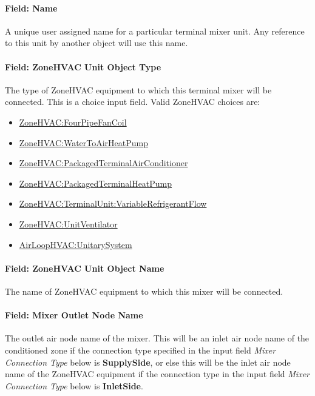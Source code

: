 \paragraph{Field: Name}\label{field-name-12}

A unique user assigned name for a particular terminal mixer unit. Any reference to this unit by another object will use this name.

\paragraph{Field: ZoneHVAC Unit Object Type}\label{field-zonehvac-unit-object-type}

The type of ZoneHVAC equipment to which this terminal mixer will be connected. This is a choice input field.
Valid ZoneHVAC choices are:
\begin{itemize}
\setlength{\parskip}{0pt}
\setlength{\itemsep}{0pt plus 1pt}
\item \hyperref[zonehvacfourpipefancoil]{ZoneHVAC:FourPipeFanCoil}
\item \hyperref[zonehvacwatertoairheatpump]{ZoneHVAC:WaterToAirHeatPump}
\item \hyperref[zonehvacpackagedterminalairconditioner]{ZoneHVAC:PackagedTerminalAirConditioner}
\item \hyperref[zonehvacpackagedterminalheatpump]{ZoneHVAC:PackagedTerminalHeatPump}
\item \hyperref[zonehvacterminalunitvariablerefrigerantflow]{ZoneHVAC:TerminalUnit:VariableRefrigerantFlow}
\item \hyperref[zonehvacunitventilator]{ZoneHVAC:UnitVentilator}
\item \hyperref[airloophvacunitarysystem]{AirLoopHVAC:UnitarySystem}
\end{itemize}

\paragraph{Field: ZoneHVAC Unit Object Name}\label{field-zonehvac-unit-object-name}

The name of ZoneHVAC equipment to which this mixer will be connected.

\paragraph{Field: Mixer Outlet Node Name}\label{field-mixer-outlet-node-name}

The outlet air node name of the mixer. This will be an inlet air node name of the conditioned zone if the connection type specified in the input field \textit{Mixer Connection Type} below is \textbf{SupplySide}, or else this will be the inlet air node name of the ZoneHVAC equipment if the connection type in the input field \textit{Mixer Connection Type} below is \textbf{InletSide}.

